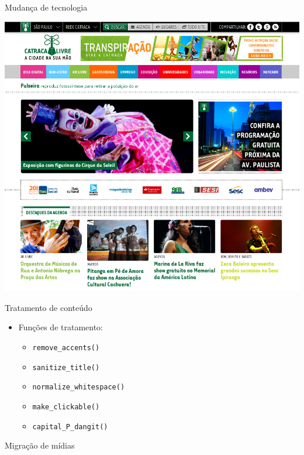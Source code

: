 \documentclass[handout]{beamer}
\begin{document}
\begin{frame}{Mudança de tecnologia}
  \begin{center}
    \pause \includegraphics[height=0.8\textheight,natwidth=800,natheight=731]{./img/catracalivre.png}
  \end{center}
\end{frame}

\begin{frame}{Tratamento de conteúdo}
  \begin{itemize}
    \pause \item Funções de tratamento:
    \begin{itemize}
      \pause \item \texttt{remove\_accents()}
      \pause \item \texttt{sanitize\_title()}
      \pause \item \texttt{normalize\_whitespace()}
      \pause \item \texttt{make\_clickable()}
      \pause \item \texttt{capital\_P\_dangit()}
    \end{itemize}
  \end{itemize}
\end{frame}

\begin{frame}{Migração de mídias}
  
\end{frame}
\end{document}
